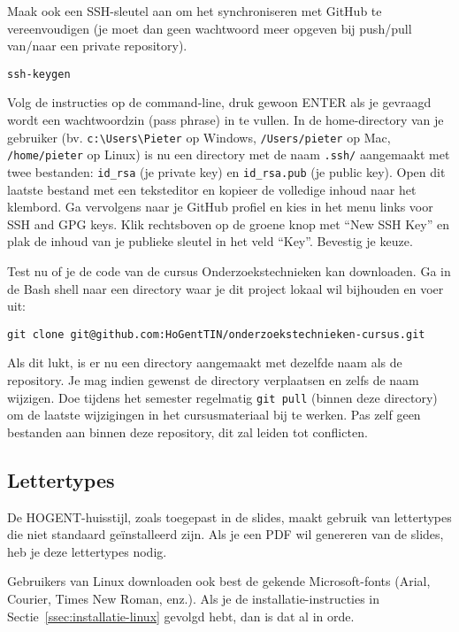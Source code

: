 Maak ook een SSH-sleutel aan om het synchroniseren met GitHub te vereenvoudigen (je moet dan geen wachtwoord meer opgeven bij push/pull van/naar een private repository).

\begin{verbatim}
ssh-keygen
\end{verbatim}

Volg de instructies op de command-line, druk gewoon ENTER als je gevraagd wordt een wachtwoordzin (pass phrase) in te vullen. In de home-directory van je gebruiker (bv. \verb|c:\Users\Pieter| op Windows, \verb|/Users/pieter| op Mac, \verb|/home/pieter| op Linux) is nu een directory met de naam \verb|.ssh/| aangemaakt met twee bestanden: \verb|id_rsa| (je private key) en \verb|id_rsa.pub| (je public key). Open dit laatste bestand met een teksteditor en kopieer de volledige inhoud naar het klembord. Ga vervolgens naar je GitHub profiel en kies in het menu links voor SSH and GPG keys. Klik rechtsboven op de groene knop met ``New SSH Key'' en plak de inhoud van je publieke sleutel in het veld ``Key''. Bevestig je keuze.

Test nu of je de code van de cursus Onderzoekstechnieken kan downloaden. Ga in de Bash shell naar een directory waar je dit project lokaal wil bijhouden en voer uit:

\begin{verbatim}
git clone git@github.com:HoGentTIN/onderzoekstechnieken-cursus.git
\end{verbatim}

Als dit lukt, is er nu een directory aangemaakt met dezelfde naam als de repository. Je mag indien gewenst de directory verplaatsen en zelfs de naam wijzigen. Doe tijdens het semester regelmatig \texttt{git pull} (binnen deze directory) om de laatste wijzigingen in het cursusmateriaal bij te werken. Pas zelf geen bestanden aan binnen deze repository, dit zal leiden tot conflicten.

\subsection{Lettertypes}

De HOGENT-huisstijl, zoals toegepast in de slides, maakt gebruik van lettertypes die niet standaard geïnstalleerd zijn. Als je een PDF wil genereren van de slides, heb je deze lettertypes nodig.

Gebruikers van Linux downloaden ook best de gekende Microsoft-fonts (Arial, Courier, Times New Roman, enz.). Als je de installatie-instructies in Sectie~\ref{ssec:installatie-linux} gevolgd hebt, dan is dat al in orde.


